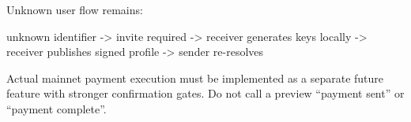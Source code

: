 \documentclass[
]{article}
\newenvironment{Shaded}{}{}
\newcommand{\NormalTok}[1]{#1}
\begin{document}
Unknown user flow remains:

\begin{Shaded}
\begin{Highlighting}[]
\NormalTok{unknown identifier {-}\textgreater{} invite required {-}\textgreater{} receiver generates keys locally {-}\textgreater{} receiver publishes signed profile {-}\textgreater{} sender re{-}resolves}
\end{Highlighting}
\end{Shaded}

Actual mainnet payment execution must be implemented as a separate
future feature with stronger confirmation gates. Do not call a preview
``payment sent'' or ``payment complete''.
\end{document}
